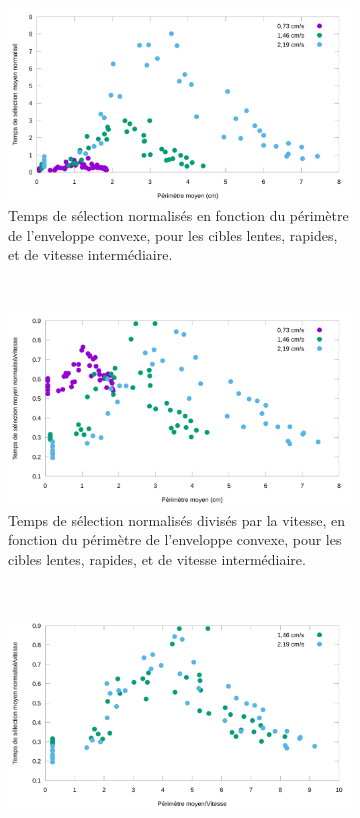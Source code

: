 	\begin{figure}[!htb]
		\begin{subfigure}[t]{0.485\textwidth}
			\centering
			\includegraphics[width=\textwidth]{figures/ch4/perfVareaRaw}
			\caption[Temps de sélection en fonction du périmètre de l'enveloppe convexe]{Temps de sélection normalisés en fonction du périmètre de l'enveloppe convexe, pour les cibles lentes, rapides, et de vitesse intermédiaire.}
			\label{fig:perfVareaRaw}
		\end{subfigure}
		~
		\begin{subfigure}[t]{0.485\textwidth}
			\centering
			\includegraphics[width=\textwidth]{figures/ch4/perfVareaTimeNormedAll}
			\caption{Temps de sélection normalisés divisés par la vitesse, en fonction du périmètre de l'enveloppe convexe, pour les cibles lentes, rapides, et de vitesse intermédiaire.}
			\label{fig:perfVareaTimeNormedAll}
		\end{subfigure}
		~
		\begin{subfigure}[t]{0.485\textwidth}
			\centering
			\includegraphics[width=\textwidth]{figures/ch4/perfVareaEverythingNormed}

\end{subfigure}
\end{figure}
